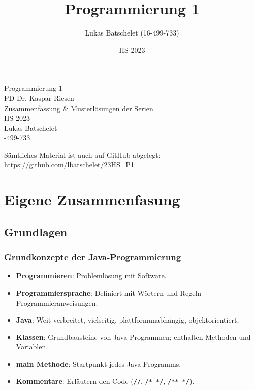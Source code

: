 \documentclass[a4paper,10pt, dvipsnames]{report}
\title{Programmierung 1}
\author{Lukas Batschelet (16-499-733)}
\date{HS 2023}
\newcommand{\github}[1]{%
   \href{#1}{\faGithubSquare}%
}
\newcommand{\javaInLine}[1]{\texttt{#1}}
\begin{document}
\begin{titlepage}
    \begin{center}
        {\huge Programmierung 1}\\[0.5cm]
        {\large PD Dr. Kaspar Riesen}\\[0.3cm]
        {\LARGE Zusammenfassung \& Musterlösungen der Serien}\\[0.5cm]
        {\large HS 2023}\\[2cm]
        {\large Lukas Batschelet}\\[0.3cm]
        {-499-733}\\[0.3cm]
    \end{center}
    \vfill %
    \noindent \github{https://github.com/lbatschelet/23HS_P1} Sämtliches Material ist auch auf GitHub abgelegt: \href{https://github.com/lbatschelet/23HS_P1}{https://github.com/lbatschelet/23HS\_P1}
    \doclicenseThis
\end{titlepage}

\tableofcontents

\chapter{Eigene Zusammenfasung}

\section{Grundlagen}

\subsection{Grundkonzepte der Java-Programmierung}

\begin{itemize}
    \item \textbf{Programmieren}: Problemlösung mit Software.
    \item \textbf{Programmiersprache}: Definiert mit Wörtern und Regeln Programmieranweisungen.
    \item \textbf{Java}: Weit verbreitet, vielseitig, plattformunabhängig, objektorientiert.
    \item \textbf{Klassen}: Grundbausteine von Java-Programmen; enthalten Methoden und Variablen.
    \item \textbf{main Methode}: Startpunkt jedes Java-Programms.
    \item \textbf{Kommentare}: Erläutern den Code (\javaInLine{//}, \javaInLine{/* */}, \javaInLine{/** */}).
\end{itemize}
\end{document}
